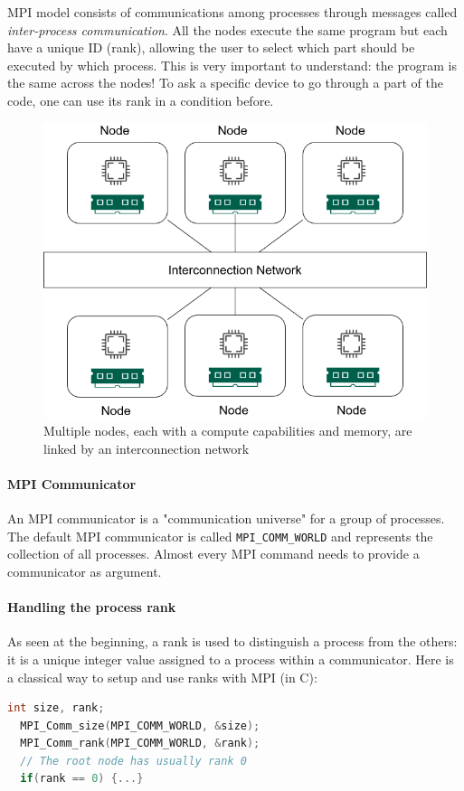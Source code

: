 \documentclass{article}
\begin{document}
MPI model consists of communications among processes through messages called \textit{inter-process communication}. All the nodes execute the same program but each have a unique ID (rank), allowing the user to select which part should be executed by which process. This is very important to understand: the program is the same across the nodes! To ask a specific device to go through a part of the code, one can use its rank in a condition before.

\begin{figure}[h!]
  \center
  \includegraphics[width=0.5\linewidth]{images/2022-08-25-11-00-37.png}
  \caption{Multiple nodes, each with a compute capabilities and memory, are linked by an interconnection network}
\end{figure}
\FloatBarrier

\paragraph{MPI Communicator}
An MPI communicator is a "communication universe" for a group of processes. The default MPI communicator is called \lstinline{MPI_COMM_WORLD} and represents the collection of all processes. Almost every MPI command needs to provide a communicator as argument.

\paragraph{Handling the process rank}
As seen at the beginning, a rank is used to distinguish a process from the others: it is a unique integer value assigned to a process within a communicator. Here is a classical way to setup and use ranks with MPI (in C):
\begin{lstlisting}[language=C]
  int size, rank;
  MPI_Comm_size(MPI_COMM_WORLD, &size);
  MPI_Comm_rank(MPI_COMM_WORLD, &rank);
  // The root node has usually rank 0
  if(rank == 0) {...}
\end{lstlisting}
\end{document}
